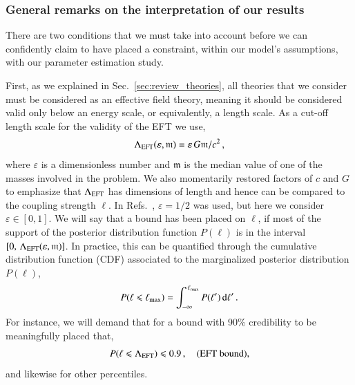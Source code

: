 \documentclass[twocolumn,
               prd,
               aps,
               superscriptaddress,
               tightenlines,
               nofootinbib,
               eqsecnum,
               amsfonts,
               amsmath,
               longbibliography]{revtex4-1}
\newcommand{\dd}{{\rm d}}
\begin{document}
\subsubsection{General remarks on the interpretation of our results}
\label{sec:remaks}

There are two conditions that we must take into account before
we can confidently claim to have placed a constraint, within our model's assumptions,
with our parameter estimation study.

First, as we explained in Sec.~\ref{sec:review_theories}, all theories that we
consider must be considered as an effective field theory, meaning it should be
considered valid only below an energy scale, or equivalently, a length scale.
%
As a cut-off length scale for the validity of the EFT we use,
%
\begin{equation}
\Lambda_{\rm EFT} (\varepsilon, \mathfrak{m}) = \varepsilon \, G \mathfrak{m} / c^2 \,,
\label{eq:def_cutoff}
\end{equation}
%
where $\varepsilon$ is a dimensionless number and $\mathfrak{m}$ is the median
value of one of the masses involved in the problem.
%
We also momentarily restored factors of $c$ and $G$ to emphasize that $\Lambda_{\rm EFT}$ has
dimensions of length and hence can be compared to the coupling strength $\ell$.
%
In Refs.~\cite{Nair:2019iur,Perkins:2021mhb,Lyu:2022gdr}, $\varepsilon = 1/2$ was used,
but here we consider $\varepsilon \in [0, 1]$.
%
We will say that a bound has been placed on $\ell$, if most of the support of
the posterior distribution function $P(\ell)$ is in the interval
$[0, \, \Lambda_{\rm EFT}(\varepsilon, \mathfrak{m})]$.
%
In practice, this can be quantified through the cumulative distribution function
(CDF) associated to the marginalized posterior distribution $P(\ell)$,
%
\begin{equation}
P(\ell \leqslant \ell_{\rm max}) = \int_{-\infty}^{\,\ell_{\rm max}} P(\ell') \, \dd \ell'\,.
\label{eq:def_cdf}
\end{equation}
%
For instance, we will demand that for a bound with 90\% credibility to be meaningfully placed that,
%
\begin{equation}
P(\ell \leqslant \Lambda_{\rm EFT}) \leqslant 0.9 \,,
\quad \textrm{(EFT bound)},
\label{eq:eft_bound}
\end{equation}
%
and likewise for other percentiles.
\end{document}
